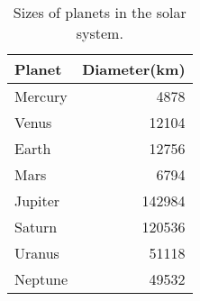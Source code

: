 \documentclass{article}
\begin{document}
\begin{table}[ht]
    \centering
    \begin{tabular}{| l | r |}
        \hline
        \textbf{Planet}  & \textbf{Diameter(km)} \\
        \hline
        Mercury          & 4878  \\
        Venus            & 12104 \\
        Earth            & 12756 \\
        Mars             & 6794  \\
        Jupiter          & 142984    \\
        Saturn           & 120536    \\
        Uranus           & 51118 \\
        Neptune          & 49532 \\
        \hline
    \end{tabular}

    \caption{Sizes of planets in the solar system.}
\end{table}
\end{document}
